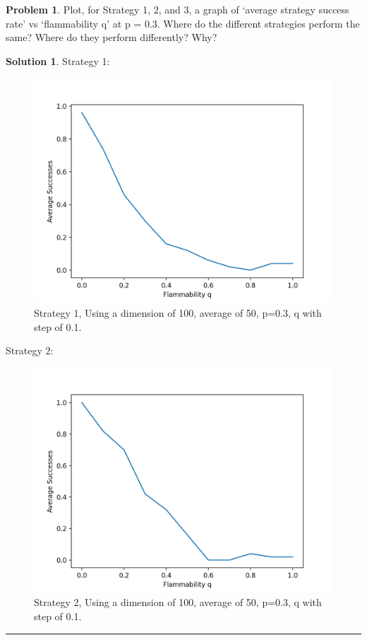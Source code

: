 \documentclass{article}
\theoremstyle{definition}
\newtheorem{problem}{Problem}
\def\fline{\rule{0.75\linewidth}{0.5pt}}
\newcommand{\finishline}{\vspace{-15pt}\begin{center}\fline\end{center}}
\newtheorem*{solution*}{Solution}
\newenvironment{solution}{\begin{solution*}}{{\finishline} \end{solution*}}
\begin{document}
\smallskip

\begin{problem}
	Plot, for Strategy 1, 2, and 3, a graph of `average strategy success rate' vs `flammability q' at p = 0.3. Where do the different strategies perform the same? Where do they perform differently? Why?
\end{problem}

\smallskip

\begin{solution}
    Strategy 1:
	\begin{figure}[h]
    \centerline{\includegraphics{P6ST1.png}}
    \caption{Strategy 1, Using a dimension of 100, average of 50, p=0.3, q with step of 0.1.}
    \label{fig}
    \end{figure}
 
    
    Strategy 2: 
    \begin{figure}[h]
    \centerline{\includegraphics{P6ST2.png}}
    \caption{Strategy 2, Using a dimension of 100, average of 50, p=0.3, q with step of 0.1.}
    \label{fig}
    \end{figure}
    

\end{solution}
\end{document}
